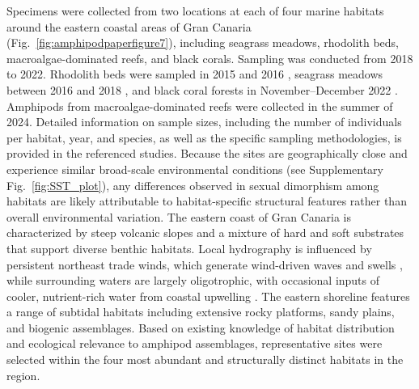 \documentclass[journal,article,submit,pdftex,moreauthors]{Definitions/mdpi}
\begin{document}
    		Specimens were collected from two locations at each of four marine habitats around the eastern coastal areas of Gran Canaria (Fig.~\ref{fig:amphipodpaperfigure7}), including seagrass meadows, rhodolith beds, macroalgae-dominated reefs, and black corals. Sampling was conducted from 2018 to 2022. Rhodolith beds were sampled in 2015 and 2016 \citep{NavarroMayoral2020}, seagrass meadows between 2016 and 2018 \citep{navarro2024hidden}, and black coral forests in November–December 2022 \citep{navarro2025inside}. Amphipods from macroalgae-dominated reefs were collected in the summer of 2024. Detailed information on sample sizes, including the number of individuals per habitat, year, and species, as well as the specific sampling methodologies, is provided in the referenced studies.  Because the sites are geographically close and experience similar broad-scale environmental conditions (see Supplementary Fig.~\ref{fig:SST_plot}), any differences observed in sexual dimorphism among habitats are likely attributable to habitat-specific structural features rather than overall environmental variation. The eastern coast of Gran Canaria is characterized by steep volcanic slopes and a mixture of hard and soft substrates that support diverse benthic habitats. Local hydrography is influenced by persistent northeast trade winds, which generate wind-driven waves and swells \citep{smith2021whole}, while surrounding waters are largely oligotrophic, with occasional inputs of cooler, nutrient-rich water from coastal upwelling \citep{ortiz2022oligotrophic}. The eastern shoreline features a range of subtidal habitats including extensive rocky platforms, sandy plains, and biogenic assemblages. Based on existing knowledge of habitat distribution and ecological relevance to amphipod assemblages, representative sites were selected within the four most abundant and structurally distinct habitats in the region.
    				
\end{document}
